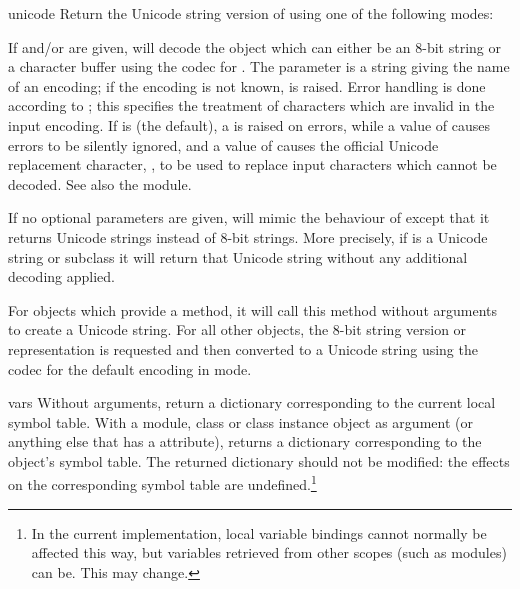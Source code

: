 \begin{funcdesc}{unicode}{}
  Return the Unicode string version of  using one of the
  following modes:

  If  and/or  are given, 
  will decode the object which can either be an 8-bit string or a
  character buffer using the codec for . The
   parameter is a string giving the name of an encoding;
  if the encoding is not known,  is raised.
  Error handling is done according to ; this specifies the
  treatment of characters which are invalid in the input encoding.  If
   is  (the default), a
   is raised on errors, while a value of
   causes errors to be silently ignored, and a value of
   causes the official Unicode replacement character,
  , to be used to replace input characters which cannot
  be decoded.  See also the  module.

  If no optional parameters are given,  will mimic the
  behaviour of  except that it returns Unicode strings
  instead of 8-bit strings. More precisely, if  is a
  Unicode string or subclass it will return that Unicode string without
  any additional decoding applied.

  For objects which provide a  method, it will
  call this method without arguments to create a Unicode string. For
  all other objects, the 8-bit string version or representation is
  requested and then converted to a Unicode string using the codec for
  the default encoding in  mode.

\end{funcdesc}

\begin{funcdesc}{vars}{}
  Without arguments, return a dictionary corresponding to the current
  local symbol table.  With a module, class or class instance object
  as argument (or anything else that has a 
  attribute), returns a dictionary corresponding to the object's
  symbol table.  The returned dictionary should not be modified: the
  effects on the corresponding symbol table are undefined.\footnote{
    In the current implementation, local variable bindings cannot
    normally be affected this way, but variables retrieved from
    other scopes (such as modules) can be.  This may change.}
\end{funcdesc}

